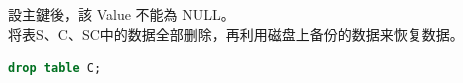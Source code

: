 \documentclass[12pt, a4paper]{report}
\begin{document}
\begin{figure}[H] %
    \centering %
\end{figure}

{設主鍵後，該 Value 不能為 NULL。}\\

将表S、C、SC中的数据全部删除，再利用磁盘上备份的数据来恢复数据。\\

\begin{lstlisting}[language=SQL]
    drop table C;
\end{lstlisting}
\end{document}
